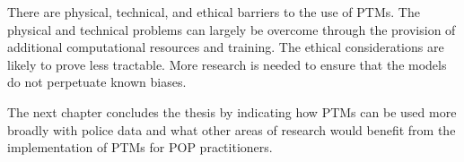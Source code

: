 There are physical, technical, and ethical barriers to the use of PTMs. The physical and technical problems can largely be overcome through the provision of additional computational resources and training. The ethical considerations are likely to prove less tractable. More research is needed to ensure that the models do not perpetuate known biases.

The next chapter concludes the thesis by indicating how PTMs can be used more broadly with police data and what other areas of research would benefit from the implementation of PTMs for POP practitioners.
